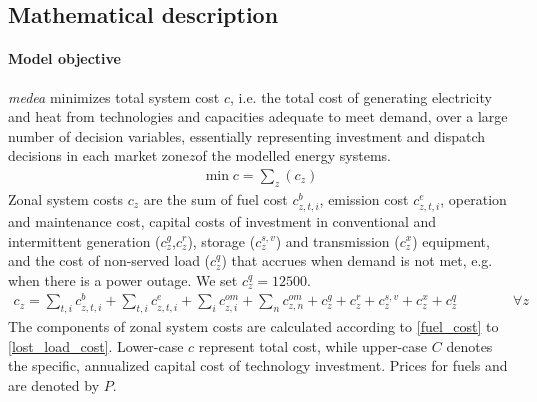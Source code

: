 \documentclass[review, 3p, times, 12pt, authoryear]{elsarticle}
\begin{document}
    \subsection{Mathematical description} \label{subsec:apdx_mathmodel}

    \paragraph{Model objective}
    \emph{medea} minimizes total system cost $c$, i.e. the total cost of generating electricity and heat from
    technologies and capacities adequate to meet demand, over a large number of decision variables, essentially
    representing investment and dispatch decisions in each market zone$z$of the modelled energy systems.
    \begin{align}
        \min c =\sum_{z} (c_{z})
    \end{align}
    Zonal system costs $c_{z}$ are the sum of fuel cost $c^{b}_{z,t,i}$, emission cost $c^{e}_{z,t,i}$, operation and
    maintenance cost, capital costs of investment in conventional and intermittent generation ($c^{g}_{z}$,$c^{r}_{z}$),
    storage ($c^{s,v}_{z}$) and transmission ($c^{x}_{z}$) equipment, and the cost of non-served load ($c^{q}_{z}$) that
    accrues when demand is not met, e.g. when there is a power outage.
    We set $c^{q}_{z} = 12500$.
    \begin{align}
        c_{z} =\sum_{t,i}  c^{b}_{z,t,i} +\sum_{t,i} c^{e}_{z,t,i} +\sum_{i} c^{om}_{z,i} +\sum_{n} c^{om}_{z,n} + c^{g}_{z} +
        c^{r}_{z} + c^{s,v}_{z} + c^{x}_{z} + c^{q}_{z} \qquad \qquad \forall z
    \end{align}
    The components of zonal system costs are calculated according to \autoref{fuel_cost} to \autoref{lost_load_cost}.
    Lower-case $c$ represent total cost, while upper-case $C$ denotes the specific, annualized capital cost of technology investment.
    Prices for fuels and  are denoted by $P$.
\end{document}
